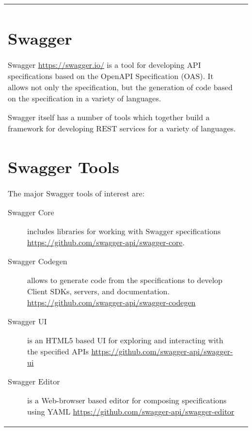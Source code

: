 \begin{tabular}{ll}
\begin{comment}
Invalid Client Requests

Code  Description
405 Method Not Allowed.
406 Not Acceptable.
410 Gone.
411 Length Required.
412 Precondition Failed.
413 Entity Too Large.
414 URI Too Long.
415 Unsupported Media Type.
417 Expectation Failed.


Code  Description
500 Internal Server Error.
501 Not Implemented.
503 Service Unavailable.

\end{lstlisting}

\end{comment}



\section{Swagger}

Swagger \url{https://swagger.io/} is a tool for developing API
specifications based on the OpenAPI Specification (OAS). It allows not
only the specification, but the generation of code based on the
specification in a variety of languages.

Swagger itself has a number of tools which together build a framework
for developing REST services for a variety of languages.


\section{Swagger Tools}

The major Swagger tools of interest are:

\begin{description}

\item[Swagger Core] includes libraries for working with Swagger
 specifications \url{https://github.com/swagger-api/swagger-core}.

\item[Swagger Codegen] allows to generate code from the specifications
 to develop Client SDKs, servers, and documentation. \url{https://github.com/swagger-api/swagger-codegen}

\item[Swagger UI] is an HTML5 based UI for exploring and interacting
 with the specified APIs \url{https://github.com/swagger-api/swagger-ui}

\item[Swagger Editor] is a Web-browser based editor for composing 
 specifications using YAML \url{https://github.com/swagger-api/swagger-editor}


\end{description}
\end{tabular}
